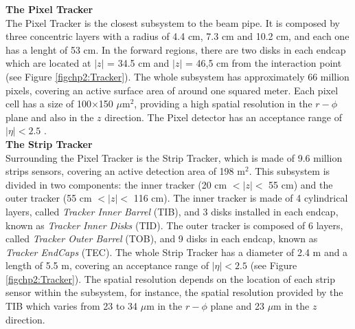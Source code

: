 
\textbf{The Pixel Tracker}\\

\noindent The Pixel Tracker is the closest subsystem to the beam pipe. It is 
composed by three concentric layers with a radius of 4.4 cm, 7.3 cm and 10.2 cm, and each one has a lenght of 53 cm. In 
the forward regions, there are two disks in each endcap which are located at $|z|$ = 34.5 cm and $|z|$ =  46,5 cm from 
the interaction point (see Figure \ref{figchp2:Tracker}). The whole subsystem has 
approximately 66 million pixels, covering an active surface area of around
one squared meter. Each pixel cell has a size of 100$\times$150 $\mu$m$^{2}$, providing a high 
spatial resolution in the $r-\phi$ plane and also in the $z$ direction. The Pixel detector has 
an acceptance range of $|\eta| < 2.5$ \cite{chp2:CMS}.\\


\textbf{The Strip Tracker} \\

\noindent Surrounding the Pixel Tracker is the Strip Tracker, which is made of 9.6 million strips sensors,
covering an active detection area of 198 m$^{2}$. This subsystem is divided in two 
components: the inner tracker (20 cm $< |z| <$ 55 cm) and the outer 
tracker (55 cm $< |z| <$ 116 cm). The inner tracker
is made of 4 cylindrical layers, called \textit{Tracker Inner Barrel} (TIB), and 3 disks
installed in each endcap, known as \textit{Tracker Inner Disks} (TID). The outer tracker
is composed of 6 layers, called \textit{Tracker Outer Barrel} (TOB), and 9 disks in each 
endcap, known as \textit{Tracker EndCaps} (TEC). The whole Strip Tracker has 
a diameter of 2.4 m and a length of 5.5 m, covering an acceptance range 
of $|\eta| < 2.5$ (see Figure \ref{figchp2:Tracker}). The spatial resolution depends 
on the location of each strip sensor within the subsystem, for instance, the spatial 
resolution provided by the TIB which varies from 23 to 34 $\mu$m in the $r-\phi$ plane and 23 $\mu$m in 
the $z$ direction. \\

